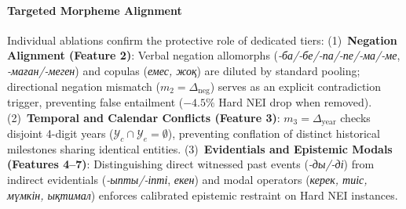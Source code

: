 \paragraph{Targeted Morpheme Alignment}
Individual ablations confirm the protective role of dedicated tiers: (1)~\textbf{Negation Alignment (Feature 2)}: Verbal negation allomorphs (\textit{-ба/-бе/-па/-пе/-ма/-ме}, \textit{-маған/-меген}) and copulas (\textit{емес, жоқ}) are diluted by standard pooling; directional negation mismatch ($m_2 = \Delta_{\text{neg}}$) serves as an explicit contradiction trigger, preventing false entailment ($-4.5\%$ Hard NEI drop when removed). (2)~\textbf{Temporal and Calendar Conflicts (Feature 3)}: $m_3 = \Delta_{\text{year}}$ checks disjoint 4-digit years ($\mathcal{Y}_c \cap \mathcal{Y}_e = \emptyset$), preventing conflation of distinct historical milestones sharing identical entities. (3)~\textbf{Evidentials and Epistemic Modals (Features 4--7)}: Distinguishing direct witnessed past events (\textit{-ды/-ді}) from indirect evidentials (\textit{-ыпты/-іпті}, \textit{екен}) and modal operators (\textit{керек, тиіс, мүмкін, ықтимал}) enforces calibrated epistemic restraint on Hard NEI instances.
